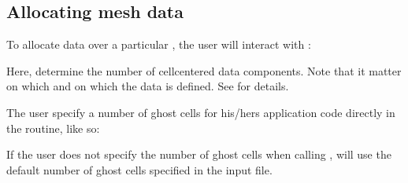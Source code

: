 \documentclass[letterpaper,10pt,english]{sphinxmanual}
\begin{document}
\subsection{Allocating mesh data}
\label{\detokenize{Source/MeshData:allocating-mesh-data}}
\sphinxAtStartPar
To allocate data over a particular , the user will interact with {\hyperref[\detokenize{Source/AmrMesh:chap-amrmesh}]{}}:

\begin{sphinxVerbatim}[commandchars=\\\{\},formatcom=\scriptsize]
   
 
   
\end{sphinxVerbatim}

\sphinxAtStartPar
Here,  determine the number of cell\sphinxhyphen{}centered data components.
Note that it  matter on which  and on which  the data is defined.
See {\hyperref[\detokenize{Source/Realm:chap-realm}]{}} for details.

\sphinxAtStartPar
The user  specify a number of ghost cells for his/hers application code directly in the  routine, like so:

\begin{sphinxVerbatim}[commandchars=\\\{\},formatcom=\scriptsize]
   
 
    
\end{sphinxVerbatim}

\sphinxAtStartPar
If the user does not specify the number of ghost cells when calling ,  will use the default number of ghost cells specified in the input file.
\end{document}
